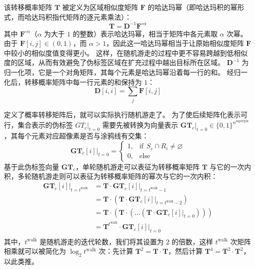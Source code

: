 该转移概率矩阵 $\mathbf{T}$ 被定义为区域相似度矩阵 $\mathbf{F}$ 的哈达玛幂（即哈达玛积的幂形式，而哈达玛积指代矩阵的逐元素乘法）：
\begin{equation}
\mathbf{T} = \mathbf{D}^{-1}\mathbf{F}^{\circ \alpha}
\end{equation}
其中 $\mathbf{F}^{\circ \alpha}$（$\alpha$ 为大于 $1$ 的整数）表示哈达玛幂，相当于矩阵中各元素取 $\alpha$ 次幂。
由于 $\mathbf{F}[i,j] \in (0,1)$，而 $\alpha > 1$，因此这一哈达玛幂相当于让原始相似度矩阵 $\mathbf{F}$ 中较小的相似度值变得更小。
这样，在随机游走的过程中更不容易跨越到低相似度的区域，从而有效避免了伪标签区域在扩充过程中越出目标所在区域。
$\mathbf{D}^{-1}$ 为归一化项，它是一个对角矩阵，其每个元素是哈达玛幂沿着每一行的和。
经归一化后，转移概率矩阵中每一行元素的和保持为 $1$：
\begin{equation}
\mathbf{D}[i,i] = \sum_j \mathbf{F}[i,j]
\end{equation}
\par
定义了概率转移矩阵后，就可以实际执行随机游走了。
为了使后续矩阵化表示可行，集合表示的伪标签 $GT_c\vert_{t=0}$ 需要先被转换为向量表示 $\mathbf{GT}_{c}\vert_{t=0} \in \{0,1\}^{n^\text{superpix}}$，其每个元素对应超像素是否与涂鸦线有交集：
\begin{equation}
\mathbf{GT}_c[i]\vert_{t=0} =
\begin{cases}
1,&\text{if}\ \ S_c \cap R_i \neq \varnothing\\
0,&\text{else}
\end{cases}
\end{equation}
基于此伪标签向量 $\mathbf{GT}_{c}$，单轮随机游走可以表征为转移概率矩阵 $\mathbf{T}$ 与它的一次内积，多轮随机游走则可以表征为转移概率矩阵的幂次与它的一次内积：
\begin{equation}
\begin{split}
\mathbf{GT}_c[i]\vert_{t=t^\text{walk}}
&= \mathbf{T} \cdot \mathbf{GT}_c[i]\vert_{t=t^\text{walk}-1}\\
&= \mathbf{T} \cdot (\mathbf{T} \cdot \mathbf{GT}_c[i]\vert_{t=t^\text{walk}-2})\\
&= \mathbf{T} \cdot (\mathbf{T} \cdot ( \dots (\mathbf{T} \cdot \mathbf{GT}_c[i]\vert_{t=0})))\\
&= \mathbf{T}^{t^\text{walk}} \cdot \mathbf{GT}_c[i]\vert_{t=0}\\
\end{split}
\end{equation}
其中，$t^\text{walk}$ 是随机游走的迭代轮数，我们将其设置为 $2$ 的倍数，这样 $t^\text{walk}$ 次矩阵相乘就可以被简化为 $\log_{2}{t^\text{walk}}$ 次：先计算 $\mathbf{T}^2 = \mathbf{T} \cdot \mathbf{T}$，然后计算 $\mathbf{T}^4 = \mathbf{T}^2 \cdot \mathbf{T}^2$，以此类推。
